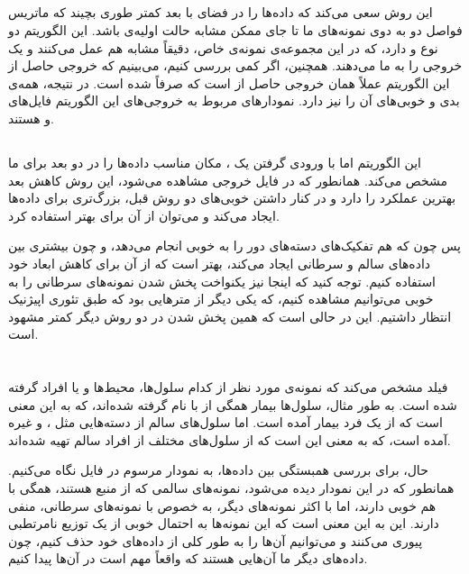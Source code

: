 \documentclass[12pt,onecolumn,a4paper]{article}
\begin{document}
\subsection{}
این روش سعی می‌کند که داده‌ها را در فضای با بعد کمتر طوری بچیند که ماتریس فواصل دو به دوی نمونه‌های ما تا جای ممکن مشابه حالت اولیه‌ی  باشد. این الگوریتم دو نوع  و  دارد، که در این مجموعه‌ی نمونه‌ی خاص، دقیقاً مشابه هم عمل می‌کنند و یک خروجی را به ما می‌دهند. همچنین، اگر کمی بررسی کنیم، می‌بینیم که خروجی حاصل از این الگوریتم عملاً همان خروجی حاصل از  است که صرفاً  شده است. در نتیجه، همه‌ی بدی و خوبی‌های آن را نیز دارد. نمودار‌های مربوط به خروجی‌های این الگوریتم فایل‌های  و  هستند.

\subsection{}
این الگوریتم اما با ورودی گرفتن یک ، مکان مناسب داده‌ها را در دو بعد برای ما مشخص می‌کند. همانطور که در فایل خروجی  مشاهده می‌شود، این روش کاهش بعد بهترین عملکرد را دارد و در کنار داشتن خوبی‌های دو روش قبل،  بزرگ‌تری برای داده‌ها ایجاد می‌کند و می‌توان از آن برای  بهتر استفاده کرد.

پس چون که  هم تفکیک‌های دسته‌های دور را به خوبی انجام می‌دهد، و چون  بیشتری بین داده‌های سالم و سرطانی ایجاد می‌کند، بهتر است که از آن برای کاهش ابعاد خود استفاده کنیم. توجه کنید که اینجا نیز یکنواخت پخش شدن نمونه‌های سرطانی را به خوبی می‌توانیم مشاهده کنیم، که یکی دیگر از متر‌هایی بود که طبق تئوری اپیژنیک انتظار داشتیم. این در حالی است که همین پخش شدن در دو روش دیگر کمتر مشهود است.

\section{}
فیلد  مشخص می‌کند که نمونه‌ی مورد نظر از کدام سلول‌ها، محیط‌ها و یا افراد گرفته شده است. به طور مثال، سلول‌ها بیمار همگی از  با نام  گرفته شده‌اند، که به این معنی است که از یک فرد بیمار آمده است. اما سلول‌های سالم از دسته‌هایی مثل ،  و غیره آمده است، که به معنی این است که از سلول‌های مختلف از افراد سالم تهیه شده‌اند.

حال، برای بررسی همبستگی بین داده‌ها، به نمودار مرسوم در فایل  نگاه می‌کنیم. همانطور که در این نمودار دیده می‌شود، نمونه‌های سالمی که از منبع  هستند، همگی با هم  خوبی دارند، اما با اکثر نمونه‌های دیگر، به خصوص با نمونه‌های سرطانی،  منفی دارند. این به این معنی است که این نمونه‌ها به احتمال خوبی از یک توزیع نامرتطبی پیوری می‌کنند و می‌توانیم آن‌ها را به طور کلی از داده‌های خود حذف کنیم، چون داده‌های دیگر ما آن‌هایی هستند که واقعاً مهم است در آن‌ها  پیدا کنیم.
\end{document}
